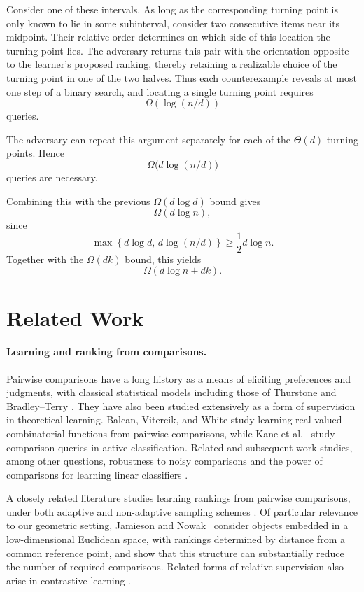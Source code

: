 \documentclass[11pt]{article}
\theoremstyle{definition}
\theoremstyle{remark}
\begin{document}
Consider one of these intervals. As long as the corresponding turning point
is only known to lie in some subinterval, consider two consecutive items near
its midpoint. Their relative order determines on which side of this location
the turning point lies. The adversary returns this pair with the orientation
opposite to the learner's proposed ranking, thereby retaining a realizable
choice of the turning point in one of the two halves. Thus each
counterexample reveals at most one step of a binary search, and locating a
single turning point requires
\[
    \Omega(\log(n/d))
\]
queries.

The adversary can repeat this argument separately for each of the
$\Theta(d)$ turning points. Hence
\[
    \Omega\bigl(d\log(n/d)\bigr)
\]
queries are necessary.

Combining this with the previous $\Omega(d\log d)$ bound gives
\[
    \Omega(d\log n),
\]
since
\[
    \max\!\left\{
        d\log d,\,
        d\log(n/d)
    \right\}
    \geq
    \frac12 d\log n.
\]
Together with the $\Omega(dk)$ bound, this yields
\[
    \Omega(d\log n+dk).
\]

\section{Related Work}\label{sec:related-work}
\paragraph{Learning and ranking from comparisons.}
Pairwise comparisons have a long history as a means of eliciting preferences
and judgments, with classical statistical models including those of Thurstone
and Bradley--Terry \cite{Thurstone1927,BradleyTerry1952}. They have also been
studied extensively as a form of supervision in theoretical learning.
Balcan, Vitercik, and White \cite{BalcanVitercikWhite2016} study learning
real-valued combinatorial functions from pairwise comparisons, while
Kane et al.~\cite{KaneEtAl2017} study comparison queries in active
classification. Related and subsequent work studies, among other questions,
robustness to noisy comparisons and the power of comparisons for learning
linear classifiers
\cite{XuEtAl2017,HopkinsKaneLovett2020,HopkinsEtAl2020}.


A closely related literature studies learning rankings from pairwise
comparisons, under both adaptive and non-adaptive sampling schemes
\cite{JamiesonNowak2011,Ailon2011,AilonBegleiterEzra2012,
RajkumarAgarwal2016,AgarwalEtAl2017}. Of particular relevance to our geometric setting, Jamieson and
Nowak~\cite{JamiesonNowak2011} consider objects embedded in a
low-dimensional Euclidean space, with rankings determined by distance from
a common reference point, and show that this structure can substantially
reduce the number of required comparisons.
Related forms of relative supervision also arise in contrastive learning
\cite{AlonEtAl2024}.
\end{document}
